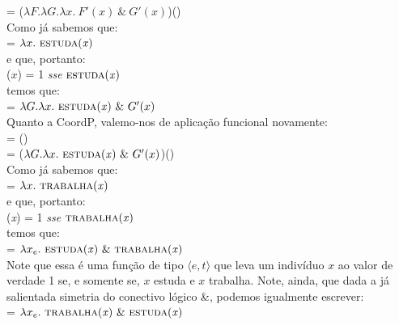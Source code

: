\n = ($\lambda F.\lambda G.\lambda x.\ F'(x)\ \&\
G'(x)$)() \\


\n Como já sabemos que:\\

\n {} = $\lambda x.\ \predica{estuda}{x}$ \\

\n e que, portanto:\\

\n {}($x$) = 1 \textit{sse} $\text{\textsc{estuda}(\textit{x})}$ \\

\n temos que:\\

\n {} = $\lambda G.\lambda x.\ \text{\textsc{estuda}(\textit{x})}\
\&\ G'(x)$\\

\n Quanto a CoordP, valemo-nos de aplica\-ção funcional
novamente:\\

\n {} = ()\\

\n = ($\lambda G.\lambda x.\ \predica{estuda}{x}\ \&\
G'(x)$)()\\

\n Como já sabemos que:\\

\n {} = $\lambda x.\ \predica{trabalha}{x}$ \\

\n e que, portanto: \\

\n {}(\textit{x}) = 1 \textit{sse} $\text{\textsc{trabalha}(\textit{x})}$\\

\n temos que:\\

\n {} = $\lambda x_{e}.\ \predica{estuda}{x}\ \&\ \predica{trabalha}{x}$\\

\n Note que essa é uma função de tipo $\langle e,t\rangle$ que leva um indivíduo $x$ ao valor de verdade 1 se, e somente se, $x$ estuda e $x$ trabalha. Note, ainda, que dada a já salientada simetria do conectivo lógico \&, podemos igualmente escrever: \\

\n {} = $\lambda x_{e}.\ \predica{trabalha}{x}\ \&\ \predica{estuda}{x}$\\


